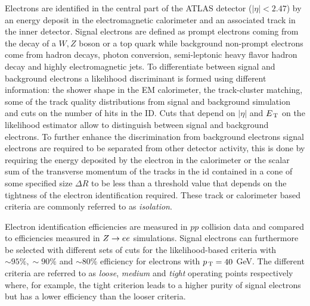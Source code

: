 Electrons are identified in the central part of the ATLAS detector
($|\eta| < 2.47$) by an energy deposit in the electromagnetic calorimeter and an
associated track in the inner detector. Signal electrons are defined as prompt
electrons coming from the decay of a $W, Z$ boson or a top quark while
background non-prompt electrons come from hadron decays, photon conversion,
semi-leptonic heavy flavor hadron decay and highly electromagnetic jets. To
differentiate between signal and background electrons a likelihood discriminant
is formed using different information: the shower shape in the EM calorimeter,
the track-cluster matching, some of the track quality distributions from signal
and background simulation and cuts on the number of hits in the ID\@. Cuts that
depend on $|\eta|$ and $E_\mathrm{\, T}$ on the likelihood estimator allow to distinguish
between signal and background electrons. To further enhance the discrimination
from background electrons signal electrons are required to be separated from
other detector activity, this is done by requiring the energy deposited by the
electron in the calorimeter or the scalar sum of the transverse momentum of the
tracks in the \gls{id} contained in a cone of some specified size $\Delta R$ to
be less than a threshold value that depends on the tightness of the electron
identification required. These track or calorimeter based criteria are commonly
referred to as \emph{isolation}.

Electron identification efficiencies are measured in $pp$ collision data and
compared to efficiencies measured in $Z \to e e$ simulations. Signal electrons can
furthermore be selected with different sets of cuts for the likelihood-based
criteria with $\sim 95\%, \sim 90\%$ and $\sim 80\%$ efficiency for electrons
with $p_\mathrm{\, T} = 40~$GeV. The different criteria are referred to as \emph{loose},
\emph{medium} and \emph{tight} operating points respectively~\cite{ATL-EL-IDENT}
where, for example, the tight criterion leads to a higher purity of signal
electrons but has a lower efficiency than the looser criteria.

